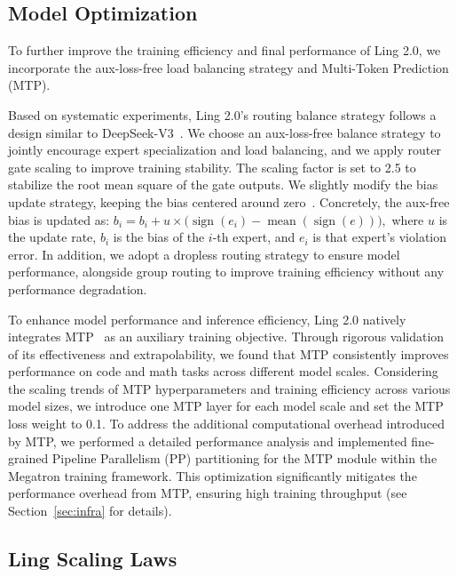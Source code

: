 \subsection{Model Optimization}
To further improve the training efficiency and final performance of Ling 2.0, we incorporate the aux-loss-free load balancing strategy and Multi-Token Prediction (MTP).

\label{sec:load_balance}
Based on systematic experiments, Ling 2.0's routing balance strategy follows a design similar to DeepSeek-V3~\citep{deepseekai2024deepseekv3technicalreport}. We choose an aux-loss-free balance strategy to jointly encourage expert specialization and load balancing, and we apply router gate scaling to improve training stability. The scaling factor is set to 2.5 to stabilize the root mean square of the gate outputs. We slightly modify the bias update strategy, keeping the bias centered around zero~\citep{liu2025muon}. Concretely, the aux-free bias is updated as:
$b_i = b_i + u \times \bigl(\operatorname{sign}(e_i) - \operatorname{mean}(\operatorname{sign}(e))\bigr),$
where $u$ is the update rate, $b_i$ is the bias of the $i$-th expert, and $e_i$ is that expert's violation error.
In addition, we adopt a dropless routing strategy to ensure model performance, alongside group routing to improve training efficiency without any performance degradation.


\label{sec:mtp}
To enhance model performance and inference efficiency, Ling 2.0 natively integrates MTP~\citep{gloeckle2024better,deepseekai2024deepseekv3technicalreport}  as an auxiliary training objective. Through rigorous validation of its effectiveness and extrapolability, we found that MTP consistently improves performance on code and math tasks across different model scales. Considering the scaling trends of MTP hyperparameters and training efficiency across various model sizes, we introduce one MTP layer for each model scale and set the MTP loss weight to 0.1. 
To address the additional computational overhead introduced by MTP, we performed a detailed performance analysis and implemented fine-grained Pipeline Parallelism (PP) partitioning for the MTP module within the Megatron training framework. This optimization significantly mitigates the performance overhead from MTP, ensuring high training throughput (see Section~\ref{sec:infra} for details).

\subsection{Ling Scaling Laws}
\label{sec:scaling_law}

